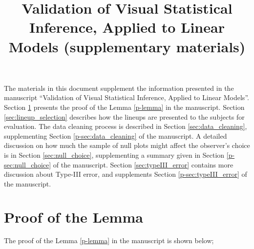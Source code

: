 \documentclass[12pt]{article}
\title{Validation of Visual Statistical Inference, Applied to Linear Models (supplementary materials)}
\date{\vspace{-.7in}}
\begin{document}
\maketitle

\vspace{1.5cm}

The materials in this document supplement the information presented in the manuscript ``Validation of Visual Statistical Inference, Applied to Linear Models''. Section \ref{sec:proof_lemma} presents the proof of the Lemma \ref{p-lemma} in the manuscript. Section \ref{sec:lineup_selection} describes how the lineups are presented to the subjects for evaluation.  The data cleaning process is described in Section \ref{sec:data_cleaning}, supplementing Section \ref{p-sec:data_cleaning} of the manuscript. A detailed discussion on how much the sample of null plots might affect the observer's choice is in Section \ref{sec:null_choice}, supplementing a summary given in Section \ref{p-sec:null_choice} of the manuscript. Section \ref{sec:typeIII_error} contains more discussion about Type-III error, and supplements Section  \ref{p-sec:typeIII_error} of the manuscript.


\section{Proof of the Lemma} \label{sec:proof_lemma}

The proof of the Lemma \ref{p-lemma} in the manuscript is shown below;
\end{document}
